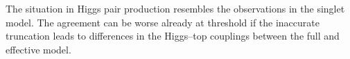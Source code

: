 The situation in Higgs pair production resembles the observations in
the singlet model.  The agreement can be worse already at threshold if
the inaccurate truncation leads to differences in the Higgs--top
couplings between the full and effective model.



